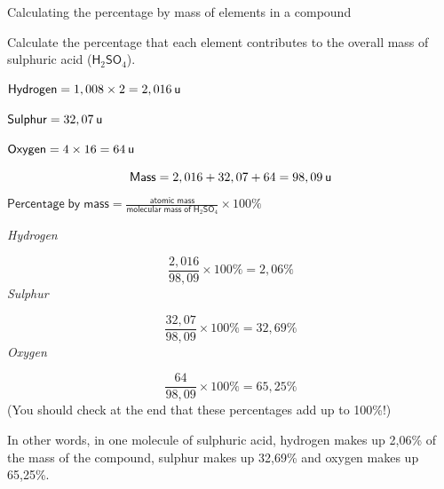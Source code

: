       \begin{wex}{Calculating the percentage by mass of elements in a compound }
{
      \label{m38712*probfhsst!!!underscore!!!id902}
      \label{m38712*id280520}Calculate the percentage that each element contributes to the overall mass of sulphuric acid (${\mathsf{H}}_{2}{\mathsf{SO}}_{4}$).\par 
      \vspace{5pt}}
{
      \label{m38712*id280575}$\mathsf{Hydrogen}=1,008\ensuremath{\times}2=2,016\phantom{\rule{2pt}{0ex}}\mathsf{u}$\par 
      \label{m38712*id280588}$\mathsf{Sulphur}=32,07\phantom{\rule{2pt}{0ex}}\mathsf{u}$\par 
      \label{m38712*id280591}$\mathsf{Oxygen}=4\ensuremath{\times}16=64\phantom{\rule{2pt}{0ex}}\mathsf{u}$\par 
      \label{m38712*id280629}\nopagebreak\noindent{}
        
    \begin{equation}
    \mathsf{Mass}=2,016+32,07+64=98,09\phantom{\rule{2pt}{0ex}}\mathsf{u}
      \end{equation}
      \label{m38712*id280688}$\mathsf{Percentage\; by\; mass}=\frac{\mathsf{atomic\; mass}}{\mathsf{molecular\; mass\; of\; H}{}_{2}\mathsf{SO}{}_{4}}\ensuremath{\times}100\%$\par 
      \label{m38712*id280729}
        \textsl{Hydrogen}
      \par 
      \label{m38712*id280735}\nopagebreak\noindent{}
        
    \begin{equation}
    \frac{2,016}{98,09}\ensuremath{\times}100\%=2,06\%
      \end{equation}
      \label{m38712*id280780}
        \textsl{Sulphur}
      \par 
      \label{m38712*id280786}\nopagebreak\noindent{}
        
    \begin{equation}
    \frac{32,07}{98,09}\ensuremath{\times}100\%=32,69\%
      \end{equation}
      \label{m38712*id280831}
        \textsl{Oxygen}
      \par 
      \label{m38712*id280837}\nopagebreak\noindent{}
        
    \begin{equation}
    \frac{64}{98,09}\ensuremath{\times}100\%=65,25\%
      \end{equation}
      \label{m38712*id280876}(You should check at the end that these percentages add up to 100\%!)\par 
      \label{m38712*id280880}In other words, in one molecule of sulphuric acid, hydrogen makes up 2,06\% of the mass of the compound, sulphur makes up 32,69\% and oxygen makes up 65,25\%.\par 
}
    \end{wex}
